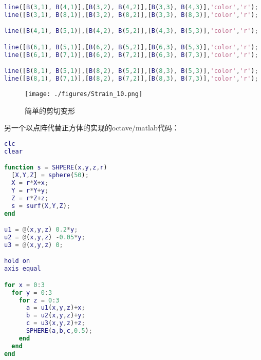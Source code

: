 \begin{lstlisting}[language=matlab]
line([B(3,1), B(4,1)],[B(3,2), B(4,2)],[B(3,3), B(4,3)],'color','r');
line([B(3,1), B(8,1)],[B(3,2), B(8,2)],[B(3,3), B(8,3)],'color','r');

line([B(4,1), B(5,1)],[B(4,2), B(5,2)],[B(4,3), B(5,3)],'color','r');

line([B(6,1), B(5,1)],[B(6,2), B(5,2)],[B(6,3), B(5,3)],'color','r');
line([B(6,1), B(7,1)],[B(6,2), B(7,2)],[B(6,3), B(7,3)],'color','r');

line([B(8,1), B(5,1)],[B(8,2), B(5,2)],[B(8,3), B(5,3)],'color','r');
line([B(8,1), B(7,1)],[B(8,2), B(7,2)],[B(8,3), B(7,3)],'color','r');

\end{lstlisting}

\begin{figure}[ht]
\centering
\texttt{[image: ./figures/Strain\_10.png]}
\caption{简单的剪切变形} \label{Strain_fig10}
\end{figure}

另一个以点阵代替正方体的实现的octave/matlab代码：
\begin{lstlisting}[language=matlab]
clc
clear

function s = SHPERE(x,y,z,r)
  [X,Y,Z] = sphere(50);
  X = r*X+x;
  Y = r*Y+y;
  Z = r*Z+z;
  s = surf(X,Y,Z);
end

u1 = @(x,y,z) 0.2*y;
u2 = @(x,y,z) -0.05*y;
u3 = @(x,y,z) 0;

hold on
axis equal

for x = 0:3
  for y = 0:3
    for z = 0:3
      a = u1(x,y,z)+x;
      b = u2(x,y,z)+y;
      c = u3(x,y,z)+z;
      SPHERE(a,b,c,0.5);
    end
  end
end
\end{lstlisting}
